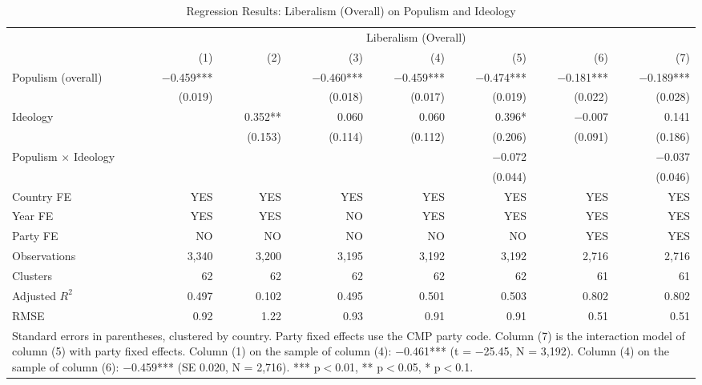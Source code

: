 \begin{table}
\caption{Regression Results: Liberalism (Overall) on Populism and Ideology}
\label{tab:4}
\scriptsize\setlength{\tabcolsep}{4pt}
\centering
\begin{tabular}{lrrrrrrr}
\toprule
 & \multicolumn{7}{c}{Liberalism (Overall)} \\
 & (1) & (2) & (3) & (4) & (5) & (6) & (7) \\
 \midrule
Populism (overall) & $-$0.459*** &  & $-$0.460*** & $-$0.459*** & $-$0.474*** & $-$0.181*** & $-$0.189*** \\
& (0.019) &  & (0.018) & (0.017) & (0.019) & (0.022) & (0.028) \\
Ideology &  & 0.352** & 0.060 & 0.060 & 0.396* & $-$0.007 & 0.141 \\
&  & (0.153) & (0.114) & (0.112) & (0.206) & (0.091) & (0.186) \\
Populism $\times$ Ideology &  &  &  &  & $-$0.072 &  & $-$0.037 \\
&  &  &  &  & (0.044) &  & (0.046) \\
\midrule
Country FE & YES & YES & YES & YES & YES & YES & YES\\
Year FE & YES & YES & NO & YES & YES & YES & YES\\
Party FE & NO & NO & NO & NO & NO & YES & YES\\
Observations & 3,340 & 3,200 & 3,195 & 3,192 & 3,192 & 2,716 & 2,716 \\
Clusters & 62 & 62 & 62 & 62 & 62 & 61 & 61 \\
Adjusted $R^2$ & 0.497 & 0.102 & 0.495 & 0.501 & 0.503 & 0.802 & 0.802 \\
RMSE & 0.92 & 1.22 & 0.93 & 0.91 & 0.91 & 0.51 & 0.51 \\
\bottomrule
\multicolumn{8}{p{0.9\linewidth}}{\scriptsize Standard errors in parentheses, clustered by country. Party fixed effects use the CMP party code. Column (7) is the interaction model of column (5) with party fixed effects. Column (1) on the sample of column (4): $-$0.461*** (t = $-$25.45, N = 3,192). Column (4) on the sample of column (6): $-$0.459*** (SE 0.020, N = 2,716). *** p$<$0.01, ** p$<$0.05, * p$<$0.1.} \\
\end{tabular}
\end{table}
